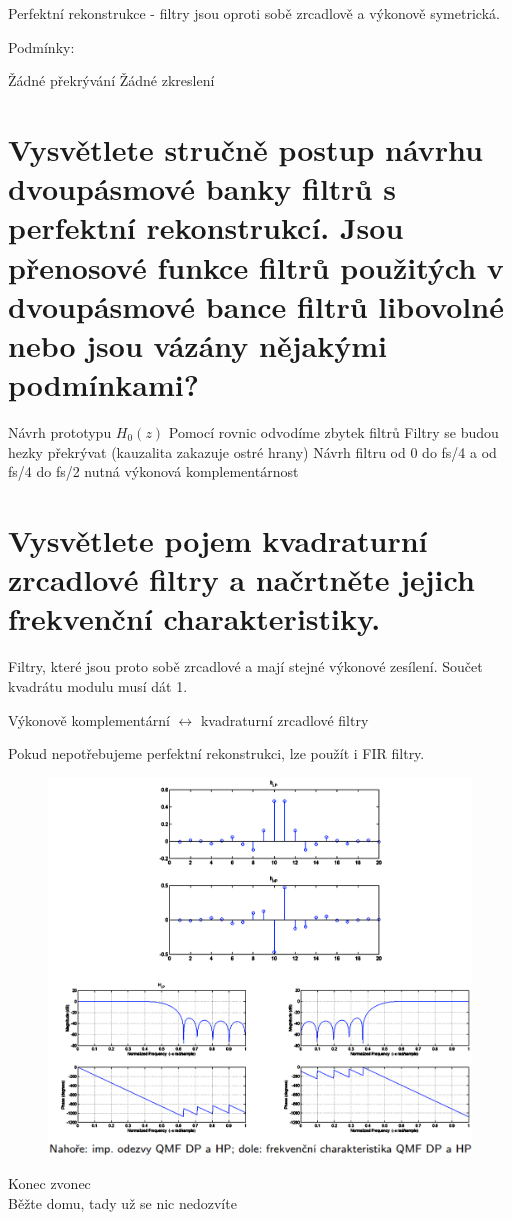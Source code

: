 \documentclass[a4paper,12pt]{article}   %
\newcommand{\mt}[1]{$#1$}
\begin{document}
Perfektní rekonstrukce - filtry jsou oproti sobě zrcadlově a výkonově symetrická.

Podmínky:
\begin{outline}
        \1 Žádné překrývání
        \1 Žádné zkreslení
\end{outline}

\FloatBarrier
\section{Vysvětlete stručně postup návrhu dvoupásmové banky filtrů s perfektní rekonstrukcí. Jsou přenosové funkce filtrů použitých v dvoupásmové bance filtrů libovolné nebo jsou vázány nějakými podmínkami?}

\begin{outline}[enumerate]
        \1 Návrh prototypu \mt{H_0(z)}
        \1 Pomocí rovnic odvodíme zbytek filtrů
                \2 Filtry se budou hezky překrývat (kauzalita zakazuje ostré hrany)
        \1 Návrh filtru od 0 do fs/4 a od fs/4 do fs/2
                \2 nutná výkonová komplementárnost
\end{outline}



\section{Vysvětlete pojem kvadraturní zrcadlové filtry a načrtněte jejich frekvenční charakteristiky.}

Filtry, které jsou proto sobě zrcadlové a mají stejné výkonové zesílení. Součet kvadrátu modulu musí dát 1. 

Výkonově komplementární \mt{\leftrightarrow} kvadraturní zrcadlové filtry

Pokud nepotřebujeme perfektní rekonstrukci, lze použít i FIR filtry.

\begin{figure}[h!]
        \centering
        \includegraphics[width=.9\textwidth]{fig/qmf.png}
\end{figure}
\FloatBarrier
\vfill
\begin{flushright}
        Konec zvonec\\
        Běžte domu, tady už se nic nedozvíte
\end{flushright}
\end{document}
